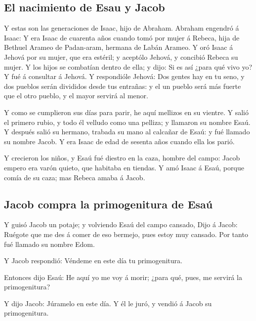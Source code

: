 \hypertarget{el-nacimiento-de-esau-y-jacob}{%
\subsection{El nacimiento de Esau y
Jacob}\label{el-nacimiento-de-esau-y-jacob}}

 Y estas son las generaciones de Isaac, hijo de Abraham.
Abraham engendró á Isaac:  Y era Isaac de cuarenta años
cuando tomó por mujer á Rebeca, hija de Bethuel Arameo de Padan-aram,
hermana de Labán Arameo.  Y oró Isaac á Jehová por su
mujer, que era estéril; y aceptólo Jehová, y concibió Rebeca su mujer.
 Y los hijos se combatían dentro de ella; y dijo: Si es
así ¿para qué vivo yo? Y fué á consultar á Jehová.  Y
respondióle Jehová: Dos gentes hay en tu seno, y dos pueblos serán
divididos desde tus entrañas: y el un pueblo será más fuerte que el otro
pueblo, y el mayor servirá al menor.

 Y como se cumplieron sus días para parir, he aquí
mellizos en su vientre.  Y salió el primero rubio, y todo
él velludo como una pelliza; y llamaron su nombre Esaú. 
Y después salió su hermano, trabada su mano al calcañar de Esaú: y fué
llamado su nombre Jacob. Y era Isaac de edad de sesenta años cuando ella
los parió.

 Y crecieron los niños, y Esaú fué diestro en la caza,
hombre del campo: Jacob empero era varón quieto, que habitaba en
tiendas.  Y amó Isaac á Esaú, porque comía de su caza;
mas Rebeca amaba á Jacob.

\hypertarget{jacob-compra-la-primogenitura-de-esauxfa}{%
\subsection{Jacob compra la primogenitura de
Esaú}\label{jacob-compra-la-primogenitura-de-esauxfa}}

 Y guisó Jacob un potaje; y volviendo Esaú del campo
cansado,  Dijo á Jacob: Ruégote que me des á comer de eso
bermejo, pues estoy muy cansado. Por tanto fué llamado su nombre Edom.

 Y Jacob respondió: Véndeme en este día tu primogenitura.

 Entonces dijo Esaú: He aquí yo me voy á morir; ¿para
qué, pues, me servirá la primogenitura?

 Y dijo Jacob: Júramelo en este día. Y él le juró, y
vendió á Jacob su primogenitura.

